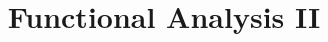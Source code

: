 \documentclass[a4paper,12pt,oneside]{book}
\title{Functional Analysis II}
\author{}
\date{}
\begin{document}



\frontmatter
\maketitle
\tableofcontents


\mainmatter 




\begin{appendices}

\end{appendices}
\printbibliography
\printindex

\end{document}
